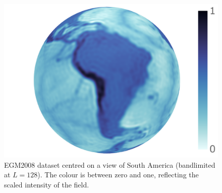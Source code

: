 \begin{figure}[htp]
	\centering
	\includegraphics[trim={22 9 7 6},clip,width=.5\textwidth]{chapter2/earth_L128_res512_real_norm.pdf}
	\caption{
		EGM2008 dataset centred on a view of South America (bandlimited at \(L=128\)).
		The colour is between zero and one, reflecting the scaled intensity of the field.
	}\label{fig:chapter2_earth}
\end{figure}

